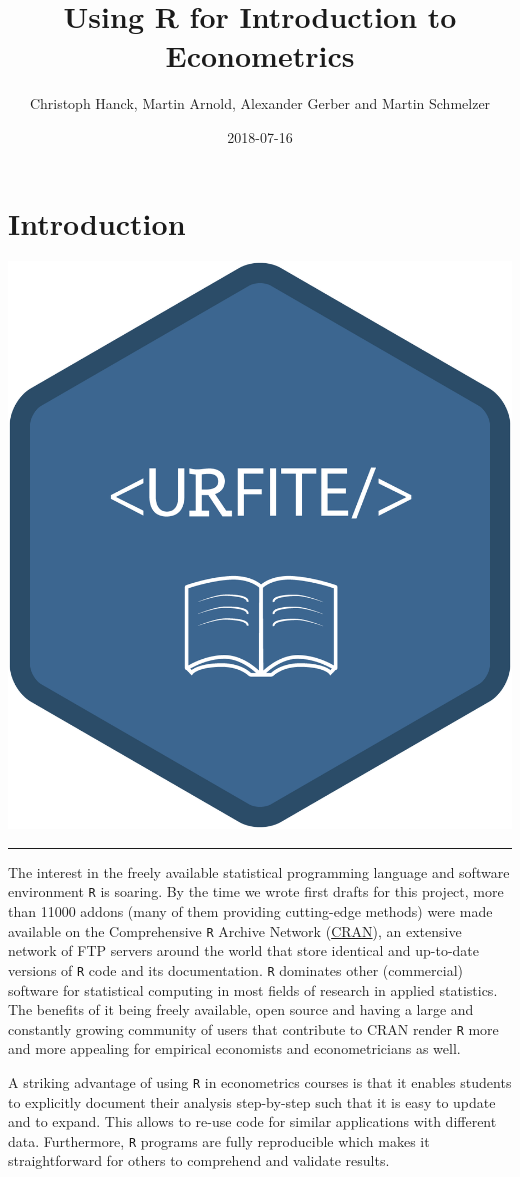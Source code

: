 \documentclass[]{book}
\title{Using R for Introduction to Econometrics}
\author{Christoph Hanck, Martin Arnold, Alexander Gerber and Martin Schmelzer}
\date{2018-07-16}
\theoremstyle{definition}
\theoremstyle{definition}
\theoremstyle{definition}
\theoremstyle{remark}
\begin{document}
\maketitle

{
\setcounter{tocdepth}{1}
\tableofcontents
}
\chapter{Introduction}\label{introduction}

\begin{center}\includegraphics[width=0.45\linewidth]{images/URFITE_logo} \end{center}

\noindent\rule{\textwidth}{1pt}

The interest in the freely available statistical programming language
and software environment \texttt{R} is soaring. By the time we wrote
first drafts for this project, more than 11000 addons (many of them
providing cutting-edge methods) were made available on the Comprehensive
\texttt{R} Archive Network (\href{https://cran.r-project.org/}{CRAN}),
an extensive network of FTP servers around the world that store
identical and up-to-date versions of \texttt{R} code and its
documentation. \texttt{R} dominates other (commercial) software for
statistical computing in most fields of research in applied statistics.
The benefits of it being freely available, open source and having a
large and constantly growing community of users that contribute to CRAN
render \texttt{R} more and more appealing for empirical economists and
econometricians as well.

A striking advantage of using \texttt{R} in econometrics courses is that
it enables students to explicitly document their analysis step-by-step
such that it is easy to update and to expand. This allows to re-use code
for similar applications with different data. Furthermore, \texttt{R}
programs are fully reproducible which makes it straightforward for
others to comprehend and validate results.
\end{document}
